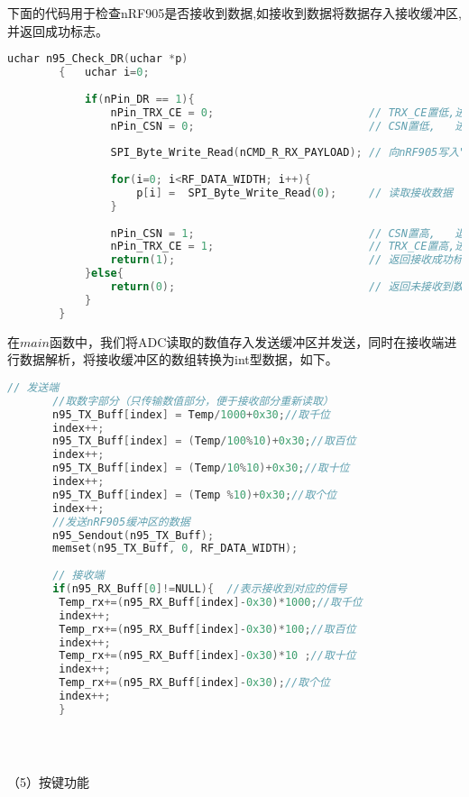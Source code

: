 \documentclass{zjureport}
\begin{document}
	   下面的代码用于检查nRF905是否接收到数据,如接收到数据将数据存入接收缓冲区,并返回成功标志。
	   \begin{lstlisting}[language=C]
	   	uchar n95_Check_DR(uchar *p)
	   	{	uchar i=0;
	   		
	   		if(nPin_DR == 1){
	   			nPin_TRX_CE = 0;						// TRX_CE置低,进入待机模式
	   			nPin_CSN = 0;							// CSN置低,   进入SPI操作模式
	   			
	   			SPI_Byte_Write_Read(nCMD_R_RX_PAYLOAD);	// 向nRF905写入"读取RXFIFO"指令
	   			
	   			for(i=0; i<RF_DATA_WIDTH; i++){
	   				p[i] = 	SPI_Byte_Write_Read(0);		// 读取接收数据
	   			}
	   			
	   			nPin_CSN = 1;							// CSN置高,   退出SPI操作模式
	   			nPin_TRX_CE = 1;						// TRX_CE置高,进入工作模式
	   			return(1);								// 返回接收成功标志
	   		}else{
	   			return(0);								// 返回未接收到数据标志
	   		}
	   	}
	   \end{lstlisting} 
	   
	   在$main$函数中，我们将ADC读取的数值存入发送缓冲区并发送，同时在接收端进行数据解析，将接收缓冲区的数组转换为int型数据，如下。
	   
	    \begin{lstlisting}[language=C]
	   // 发送端
	   //取数字部分（只传输数值部分，便于接收部分重新读取）
	   n95_TX_Buff[index] = Temp/1000+0x30;//取千位
	   index++;
	   n95_TX_Buff[index] = (Temp/100%10)+0x30;//取百位
	   index++;
	   n95_TX_Buff[index] = (Temp/10%10)+0x30;//取十位
	   index++;
	   n95_TX_Buff[index] = (Temp %10)+0x30;//取个位
	   index++;
	   //发送nRF905缓冲区的数据
	   n95_Sendout(n95_TX_Buff);
	   memset(n95_TX_Buff, 0, RF_DATA_WIDTH);
	   
	   // 接收端
	   if(n95_RX_Buff[0]!=NULL){  //表示接收到对应的信号
	   	Temp_rx+=(n95_RX_Buff[index]-0x30)*1000;//取千位
	   	index++;
	   	Temp_rx+=(n95_RX_Buff[index]-0x30)*100;//取百位
	   	index++;
	   	Temp_rx+=(n95_RX_Buff[index]-0x30)*10 ;//取十位
	   	index++;
	   	Temp_rx+=(n95_RX_Buff[index]-0x30);//取个位
	   	index++;
	   	}
	   
	   
	   \end{lstlisting} 
	   
	   
	    ~\\
	             
	（5）按键功能
	
\end{document}
